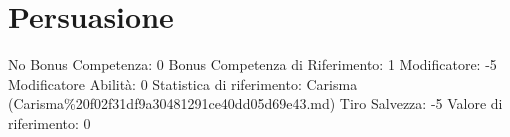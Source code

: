 \section{Persuasione}\label{persuasione}

\begin{description}
\tightlist
\item[Tags: ABI]
No Bonus Competenza: 0 Bonus Competenza di Riferimento: 1 Modificatore:
-5 Modificatore Abilità: 0 Statistica di riferimento: Carisma
(Carisma\%20f02f31df9a30481291ce40dd05d69e43.md) Tiro Salvezza: -5
Valore di riferimento: 0
\end{description}
